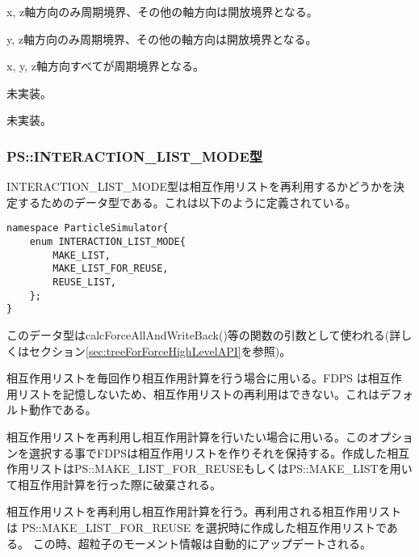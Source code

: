 
x, z軸方向のみ周期境界、その他の軸方向は開放境界となる。


y, z軸方向のみ周期境界、その他の軸方向は開放境界となる。


x, y, z軸方向すべてが周期境界となる。


未実装。


未実装。

\subsubsection{PS::INTERACTION\_LIST\_MODE型}
\label{sec:datatype_enum_interaction_list_mode}


INTERACTION\_LIST\_MODE型は相互作用リストを再利用するかどうかを決定するためのデータ型である。これは以下のように定義されている。

\begin{lstlisting}[caption=interaction\_list\_mode]
namespace ParticleSimulator{
    enum INTERACTION_LIST_MODE{
        MAKE_LIST,
        MAKE_LIST_FOR_REUSE,
        REUSE_LIST,
    };
}
\end{lstlisting}

このデータ型はcalcForceAllAndWriteBack()等の関数の引数として使われる(詳しくはセクション\ref{sec:treeForForceHighLevelAPI}を参照)。

相互作用リストを毎回作り相互作用計算を行う場合に用いる。FDPS は相互作
用リストを記憶しないため、相互作用リストの再利用はできない。これはデフォ
ルト動作である。


相互作用リストを再利用し相互作用計算を行いたい場合に用いる。このオプションを選択する事でFDPSは相互作用リストを作りそれを保持する。作成した相互作用リストはPS::MAKE\_LIST\_FOR\_REUSEもしくはPS::MAKE\_LISTを用いて相互作用計算を行った際に破棄される。

相互作用リストを再利用し相互作用計算を行う。再利用される相互作用リスト
は PS::MAKE\_LIST\_FOR\_REUSE を選択時に作成した相互作用リストである。
この時、超粒子のモーメント情報は自動的にアップデートされる。



